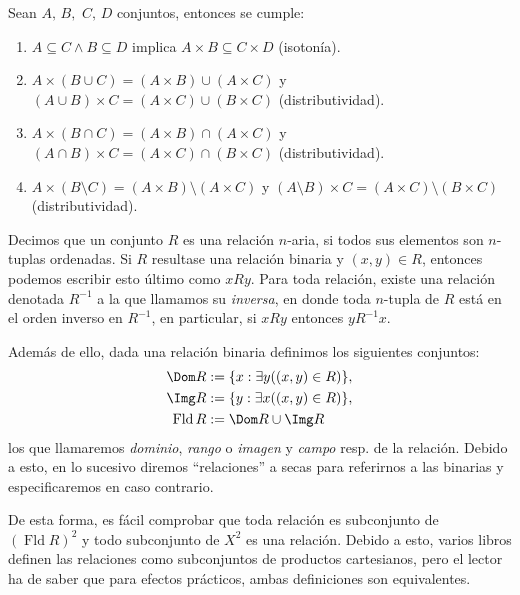 \documentclass[11pt,a4paper]{book}
\DeclareMathOperator{\Fld}{Fld}
\begin{document}
\begin{prop}
	Sean $A,\,B,$ $C,\,D$ conjuntos, entonces se cumple:
	\begin{enumerate}
		\item $A\subseteq C\wedge B\subseteq D$ implica $A\times B\subseteq C\times D$ (isotonía).
		\item $A\times(B\cup C)=(A\times B)\cup(A\times C)$ y $(A\cup B)\times C=(A\times C)\cup(B\times C)$ (distributividad).
		\item $A\times(B\cap C)=(A\times B)\cap(A\times C)$ y $(A\cap B)\times C=(A\times C)\cap(B\times C)$ (distributividad).
		\item $A\times(B\setminus C)=(A\times B)\setminus(A\times C)$ y $(A\setminus B)\times C=(A\times C)\setminus(B\times C)$ (distributividad).
	\end{enumerate}
\end{prop}
\begin{mydef}[Relación]
	Decimos que un conjunto $R$ es una relación $n$-aria, si todos sus elementos son $n$-tuplas ordenadas. Si $R$ resultase una relación binaria y $(x,y)\in R$, entonces podemos escribir esto último como $xRy$. Para toda relación, existe una relación denotada $R^{-1}$ a la que llamamos su \textit{inversa}, en donde toda $n$-tupla de $R$ está en el orden inverso en $R^{-1}$, en particular, si $xRy$ entonces $yR^{-1}x$.

	Además de ello, dada una relación binaria definimos los siguientes conjuntos:
	\begin{align*}
		\Dom R&:=\{x:\exists y((x,y)\in R)\},\\
		\Img R&:=\{y:\exists x((x,y)\in R)\},\\
		\Fld R&:=\Dom R\cup\Img R
	\end{align*}
	los que llamaremos \textit{dominio}, \textit{rango} o \textit{imagen} y \textit{campo}\nomenclature{$\Fld R$}{Campo de una relación binaria} resp. de la relación. Debido a esto, en lo sucesivo diremos ``relaciones'' a secas para referirnos a las binarias y especificaremos en caso contrario.
\end{mydef}
De esta forma, es fácil comprobar que toda relación es subconjunto de $(\Fld R)^2$ y todo subconjunto de $X^2$ es una relación. Debido a esto, varios libros definen las relaciones como subconjuntos de productos cartesianos, pero el lector ha de saber que para efectos prácticos, ambas definiciones son equivalentes.
\end{document}
